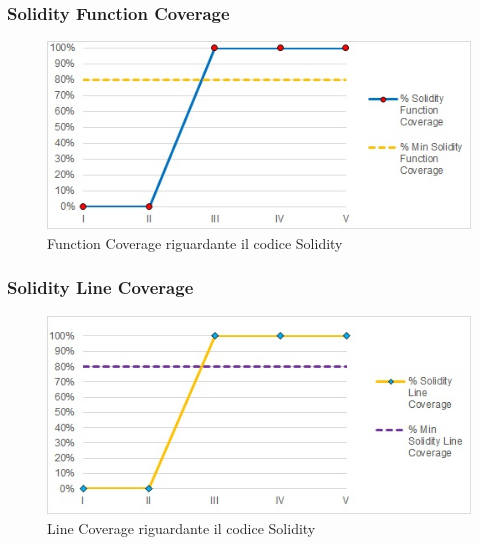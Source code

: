 \subsubsection{Solidity Function Coverage}
\begin{figure}[H]
  \centering
  \includegraphics[scale=0.8]{immagini/solidity_function.jpg}
  \caption{Function Coverage riguardante il codice Solidity}
\end{figure}

\subsubsection{Solidity Line Coverage}
\begin{figure}[H]
  \centering
  \includegraphics[scale=0.8]{immagini/solidity_line.jpg}
  \caption{Line Coverage riguardante il codice Solidity}
\end{figure}